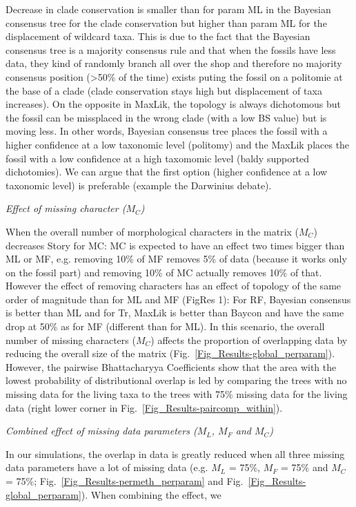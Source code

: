 \documentclass[12pt,letterpaper]{article}
\renewcommand{\subsection}[1]{%
\bigskip
\begin{center}
\begin{large}
\normalfont\itshape #1
\end{large}
\end{center}}
\begin{document}
Decrease in clade conservation is smaller than for param ML in the Bayesian consensus tree for the clade conservation but higher than param ML for the displacement of wildcard taxa. This is due to the fact that the Bayesian consensus tree is a majority consensus rule and that when the fossils have less data, they kind of randomly branch all over the shop and therefore no majority consensus position (>50\% of the time) exists puting the fossil on a politomie at the base of a clade (clade conservation stays high but displacement of taxa increases). On the opposite in MaxLik, the topology is always dichotomous but the fossil can be missplaced in the wrong clade (with a low BS value) but is moving less. In other words, Bayesian consensus tree places the fossil with a higher confidence at a low taxonomic level (politomy) and the MaxLik places the fossil with a low confidence at a high taxomomic level (baldy supported dichotomies). We can argue that the first option (higher confidence at a low taxonomic level) is preferable (example the Darwinius debate).

\subsection{Effect of missing character ($M_{C}$)}
When the overall number of morphological characters in the matrix ($M_{C}$) decreases
Story for MC: MC is expected to have an effect two times bigger than ML or MF, e.g. removing 10\% of MF removes 5\% of data (because it works only on the fossil part) and removing 10\% of MC actually removes 10\% of that.
However the effect of removing characters has an effect of topology of the same order of magnitude than for ML and MF (FigRes 1): For RF, Bayesian consensus is better than ML and for Tr, MaxLik is better than Baycon and have the same drop at 50\% as for MF (different than for ML). 
In this scenario, the overall number of missing characters ($M_{C}$) affects the proportion of overlapping data by reducing the overall size of the matrix (Fig.~\ref{Fig_Results-global_perparam}). %
However, the pairwise Bhattacharyya Coefficients show that the area with the lowest probability of distributional overlap is led by comparing the trees with no missing data for the living taxa to the trees with 75\% missing data for the living data (right lower corner in Fig.~\ref{Fig_Results-paircomp_within}). %

\subsection{Combined effect of missing data parameters ($M_{L}$, $M_{F}$ and $M_{C}$)} 
In our simulations, the overlap in data is greatly reduced when all three missing data parameters have a lot of missing data (e.g. $M_{L}$ = 75\%, $M_{F}$ = 75\% and $M_{C}$ = 75\%; Fig.~\ref{Fig_Results-permeth_perparam} and Fig.~\ref{Fig_Results-global_perparam}).
When combining the effect, we 
\end{document}
